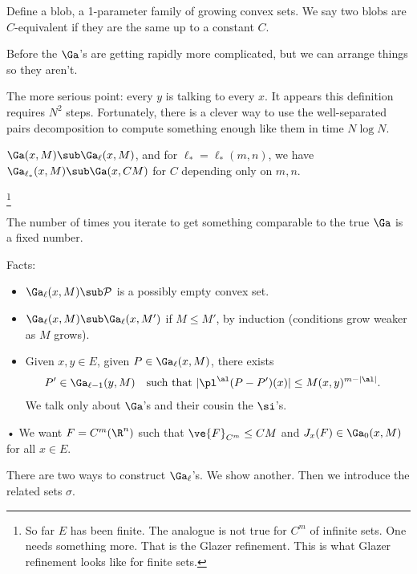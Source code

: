 Define a blob, a 1-parameter family of growing convex sets.
We say two blobs are $C$-equivalent if they are the same up to a constant $C$. 

Before the $\Ga$'s are getting rapidly more complicated, but we can arrange things so they aren't.

The more serious point: every $y$ is talking to every $x$. It appears this definition requires $N^2$ steps. Fortunately, there is a clever way to use the well-separated pairs decomposition to compute something enough like them in time $N\log N$. 

\begin{thm}
$\Ga(x,M)\sub \Ga_\ell(x,M)$, and for $\ell_*=\ell_*(m,n)$, we have $\Ga_{\ell_*}(x,M) \sub \Ga(x,CM)$ for $C$ depending only on $m,n$.
\end{thm}
\footnote{So far $E$ has been finite. The analogue is not true for $C^m$ of infinite sets. One needs something more. That is the Glazer refinement. This is what Glazer refinement looks like for finite sets.}

The number of times you iterate to get something comparable to the true $\Ga$ is a fixed number.

Facts:
\begin{itemize}
\item
$\Ga_\ell(x,M)\sub \cal P$ is a possibly empty convex set.
\item %
$\Ga_\ell(x,M)\sub \Ga_\ell(x,M')$ if $M\le M'$, by induction (conditions grow weaker as $M$ grows).
\item
Given $x,y\in E$, given $P\in \Ga_\ell(x,M)$, there exists
\begin{align}
P'&\in \Ga_{\ell-1}(y,M)&
\text{such that }|\pl^\al (P-P') (x)|&\le M(x,y)^{m-|\al|}.
\end{align}
We talk only about $\Ga$'s and their cousin the $\si$'s. %
\end{itemize}•
We want $F=C^m(\R^n)$ such that $\ve{F}_{C^m}\le CM$ and $J_x(F) \in \Ga_0(x,M)$ for all $x\in E$. 

There are two ways to construct $\Ga_\ell$'s. We show another. Then we introduce the related sets $\sigma$.

